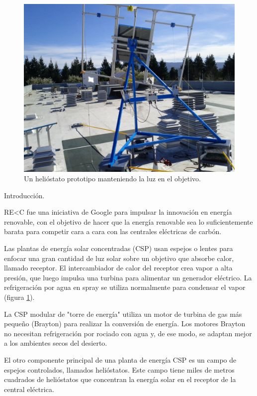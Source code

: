 \begin{figure}[h!]
  	\centering
	\includegraphics[scale=1]{FotosPaginasWebHeliostatos/HeliostatoGoogle.png}
	\caption{Un helióstato prototipo manteniendo la luz en el objetivo.~\cite{Wikipedia3WebSite}
	\label{fig:FotosPaginasWebHeliostatos/HeliostatoGoogle.png}}
\end{figure} 

Introducción.

RE\textless C fue una iniciativa de Google para impulsar la innovación en energía renovable, con el objetivo de hacer que la energía renovable sea lo suficientemente barata para competir cara a cara con las centrales eléctricas de carbón.

Las plantas de energía solar concentradas (CSP) usan espejos o lentes para enfocar una gran cantidad de luz solar sobre un objetivo que absorbe calor, llamado receptor. El intercambiador de calor del receptor crea vapor a alta presión, que luego impulsa una turbina para alimentar un generador eléctrico. La refrigeración por agua en spray se utiliza normalmente para condensar el vapor (figura \ref{fig:FotosPaginasWebHeliostatos/HeliostatoGoogle.png}).

La CSP modular de "torre de energía" utiliza un motor de turbina de gas más pequeño (Brayton) para realizar la conversión de energía. Los motores Brayton no necesitan refrigeración por rociado con agua y, de ese modo, se adaptan mejor a los ambientes secos del desierto.

El otro componente principal de una planta de energía CSP es un campo de espejos controlados, llamados helióstatos. Este campo tiene miles de metros cuadrados de helióstatos que concentran la energía solar en el receptor de la central eléctrica.

